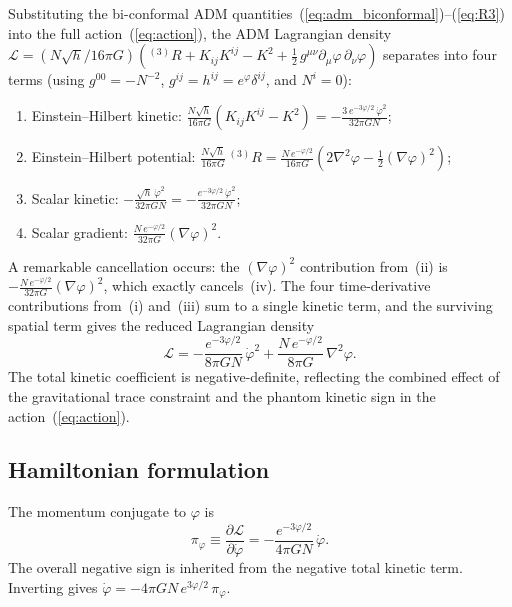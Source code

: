 \documentclass[aps,prd,onecolumn,superscriptaddress,nofootinbib,showpacs,12pt,notitlepage]{revtex4-2}
\begin{document}
Substituting the bi-conformal ADM
quantities~(\ref{eq:adm_biconformal})--(\ref{eq:R3}) into the
full action~(\ref{eq:action}), the ADM Lagrangian density
$\mathcal{L} = (N\sqrt{h}/16\pi G)({}^{(3)}\!R + K_{ij}K^{ij}
  - K^2 + \tfrac{1}{2}\,g^{\mu\nu}\partial_\mu\varphi\,
  \partial_\nu\varphi)$
separates into four terms (using
$g^{00} = -N^{-2}$, $g^{ij} = h^{ij} = e^{\varphi}\delta^{ij}$,
and $N^i = 0$):
\begin{enumerate}
\item[(i)] Einstein--Hilbert kinetic:
  $\frac{N\sqrt{h}}{16\pi G}(K_{ij}K^{ij} - K^2)
  = -\frac{3\,e^{-3\varphi/2}\,\dot{\varphi}^2}{32\pi G N}$;
\item[(ii)] Einstein--Hilbert potential:
  $\frac{N\sqrt{h}}{16\pi G}\,{}^{(3)}\!R
  = \frac{N\,e^{-\varphi/2}}{16\pi G}
    (2\nabla^2\varphi - \tfrac{1}{2}(\nabla\varphi)^2)$;
\item[(iii)] Scalar kinetic:
  $-\frac{\sqrt{h}\,\dot{\varphi}^2}{32\pi G N}
  = -\frac{e^{-3\varphi/2}\,\dot{\varphi}^2}{32\pi G N}$;
\item[(iv)] Scalar gradient:
  $\frac{N\,e^{-\varphi/2}}{32\pi G}(\nabla\varphi)^2$.
\end{enumerate}
A remarkable cancellation occurs: the
$(\nabla\varphi)^2$ contribution from~(ii) is
$-\frac{N\,e^{-\varphi/2}}{32\pi G}(\nabla\varphi)^2$,
which exactly cancels~(iv).  The four time-derivative contributions from~(i)
and~(iii) sum to a single kinetic term, and the
surviving spatial term gives the reduced Lagrangian
density
\begin{equation}\label{eq:L_reduced}
  \mathcal{L} =
    -\frac{e^{-3\varphi/2}}{8\pi G N}\,\dot{\varphi}^2
    + \frac{N\,e^{-\varphi/2}}{8\pi G}\,\nabla^2\varphi.
\end{equation}
The total kinetic coefficient is negative-definite, reflecting
the combined effect of the gravitational trace constraint and
the phantom kinetic sign in the action~(\ref{eq:action}).

\subsection{Hamiltonian formulation}
\label{sec:hamiltonian_form}

The momentum conjugate to $\varphi$ is
\begin{equation}\label{eq:pi_phi}
  \pi_\varphi \equiv
    \frac{\partial\mathcal{L}}{\partial\dot{\varphi}}
  = -\frac{e^{-3\varphi/2}}{4\pi G N}\,\dot{\varphi}.
\end{equation}
The overall negative sign is inherited from the
negative total kinetic term.  Inverting gives
$\dot{\varphi} = -4\pi G N\,e^{3\varphi/2}\,\pi_\varphi$.
\end{document}

